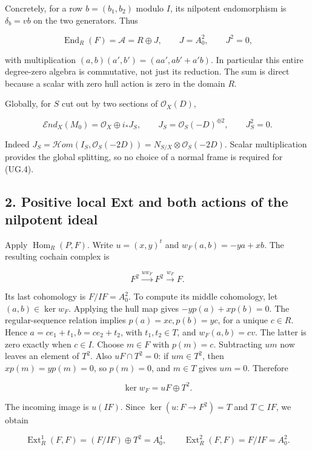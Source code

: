 Concretely, for a row \(b=(b_1,b_2)\) modulo \(I\), its nilpotent
endomorphism is \(\delta_b=v b\) on the two generators. Thus

\[
 \operatorname{End}_R(F)=\mathcal A=R\oplus J,
 \qquad J=A_0^2,\qquad J^2=0,
 \tag{UG.3}
\]

with multiplication \((a,b)(a',b')=(aa',ab'+a'b)\). In particular this
entire degree-zero algebra is commutative, not just its reduction. The
sum is direct because a scalar with zero hull action is zero in the
domain \(R\).

Globally, for \(S\) cut out by two sections of \(\mathcal O_X(D)\),

\[
 \mathcal E nd_X(M_0)=\mathcal O_X\oplus i_*J_S,
 \qquad J_S=\mathcal O_S(-D)^{\oplus2},\qquad J_S^2=0.
 \tag{UG.4}
\]

Indeed \(J_S=\mathcal H om(I_S,\mathcal O_S(-2D))
=N_{S/X}\otimes\mathcal O_S(-2D)\). Scalar multiplication provides the
global splitting, so no choice of a normal frame is required for (UG.4).

\subsection{2. Positive local Ext and both actions of the nilpotent
ideal}\label{SF-UG-positive-local-ext-and-both-actions-of-the-nilpotent-ideal}

Apply \(\operatorname{Hom}_R(P,F)\). Write \(u=(x,y)^t\) and
\(w_F(a,b)=-ya+xb\). The resulting cochain complex is

\[
 F^2\xrightarrow{u w_F}F^2\xrightarrow{w_F}F.
 \tag{UG.5}
\]

Its last cohomology is \(F/IF=A_0^2\). To compute its middle cohomology,
let \((a,b)\in\ker w_F\). Applying the hull map gives
\(-yp(a)+xp(b)=0\). The regular-sequence relation implies
\(p(a)=xc,p(b)=yc\), for a unique \(c\in R\). Hence
\(a=ce_1+t_1,b=ce_2+t_2\), with \(t_1,t_2\in T\), and \(w_F(a,b)=cv\).
The latter is zero exactly when \(c\in I\). Choose \(m\in F\) with
\(p(m)=c\). Subtracting \(u m\) now leaves an element of \(T^2\). Also
\(uF\cap T^2=0\): if \(u m\in T^2\), then \(xp(m)=yp(m)=0\), so
\(p(m)=0\), and \(m\in T\) gives \(u m=0\). Therefore

\[
 \ker w_F=uF\oplus T^2.
\]

The incoming image is \(u(IF)\). Since \(\ker(u:F\to F^2)=T\) and
\(T\subset IF\), we obtain

\[
 \operatorname{Ext}^1_R(F,F)
       =(F/IF)\oplus T^2=A_0^4,
 \qquad
 \operatorname{Ext}^2_R(F,F)=F/IF=A_0^2.
 \tag{UG.6}
\]

